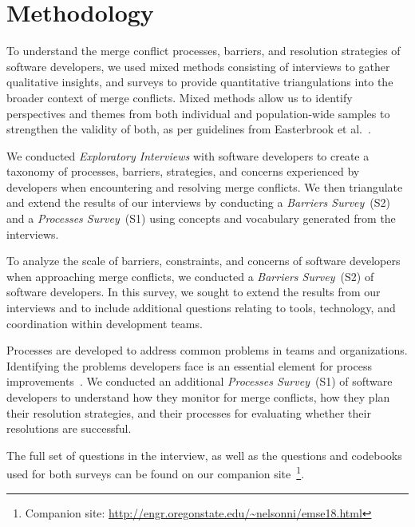 
\section{Methodology}\label{methodology}


To understand the merge conflict processes, barriers, and resolution strategies of software developers, we used mixed methods consisting of interviews to gather qualitative insights, and surveys to provide quantitative triangulations into the broader context of merge conflicts.
Mixed methods allow us to identify perspectives and themes from both individual and population-wide samples to strengthen the validity of both, as per guidelines from Easterbrook et al.~\cite{easterbrook2008selecting}.

We conducted \textit{Exploratory Interviews} with software developers to create a taxonomy of processes, barriers, strategies, and concerns experienced by developers when encountering and resolving merge conflicts.
We then triangulate and extend the results of our interviews by conducting a \textit{Barriers Survey}~(S2) and a \textit{Processes Survey}~(S1) using concepts and vocabulary generated from the interviews. 

To analyze the scale of barriers, constraints, and concerns of software developers when approaching merge conflicts, we conducted a \textit{Barriers Survey}~(S2) of software developers.
In this survey, we sought to extend the results from our interviews and to include additional questions relating to tools, technology, and coordination within development teams.

Processes are developed to address common problems in teams and organizations.
Identifying the problems developers face is an essential element for process improvements~\cite{beecham2003software}.
We conducted an additional \textit{Processes Survey}~(S1) of software developers to understand how they monitor for merge conflicts, how they plan their resolution strategies, and their processes for evaluating whether their resolutions are successful.

The full set of questions in the interview, as well as the questions and codebooks used for both surveys can be found on our companion site~\footnote{Companion site: \url{http://engr.oregonstate.edu/~nelsonni/emse18.html}}.

